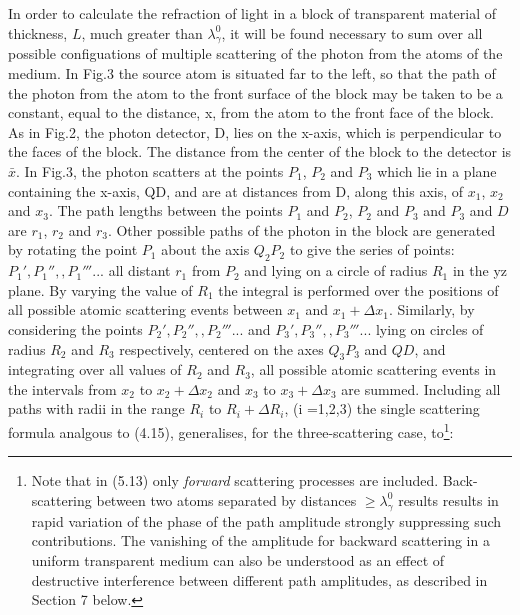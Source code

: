 \documentclass [12pt]{article}
\begin{document}
{    \par In order to calculate the
   refraction of light in a block of transparent material of thickness, $L$, much greater than $\lambda_{\gamma}^0$,
   it will be found necessary to sum over all possible configuations of multiple scattering of the
    photon from the atoms of the medium. In Fig.3 the source atom is situated far to the left,
     so that the path of the photon from the atom to the front surface of the block may be taken to
    be a constant, equal to the distance, x, from the atom to the front face of the block.
    As in Fig.2, the photon detector, D, lies on the x-axis, which is perpendicular to the
  faces of the block. The distance from the center of the block to the detector is $\bar{x}$. In 
   Fig.3, the photon scatters at the points $P_1$, $P_2$ and $P_3$ which lie in a plane
  containing the x-axis, QD, and are at distances from D, along this axis, of $x_1$, $x_2$ and $x_3$.
  The path lengths between the points $P_1$ and $P_2$,  $P_2$ and $P_3$ and  $P_3$ and $D$ are
   $r_1$, $r_2$ and $r_3$.
  Other possible paths of the photon in the block are generated by rotating the point $P_1$ 
  about the axis $Q_2 P_2$ to give the series of points: $P_1',P_1'',,P_1'''...$ all distant
  $r_1$ from $P_2$ and lying on a circle of radius $R_1$ in the yz plane. By varying the value
  of $R_1$ the integral is performed over the positions of all possible atomic scattering events 
  between $x_1$ and $x_1+\Delta x_1$. Similarly, by considering the points $P_2',P_2'',,P_2'''...$
   and $P_3',P_3'',,P_3'''...$  lying on circles of radius $R_2$ and $R_3$ respectively, 
  centered on the axes  $Q_3 P_3$ and $Q D$, and integrating over all values of 
  $R_2$ and $R_3$, all possible atomic scattering events in the intervals from  $x_2$ to $x_2+\Delta x_2$ and
   $x_3$ to $x_3+\Delta x_3$ are summed. Including all paths with radii in the range
   $R_i$ to $R_i +\Delta R_i$, (i =1,2,3) the single scattering formula analgous to (4.15),
   generalises, for the three-scattering case, to\footnote{Note that in (5.13) only {\it forward}
   scattering processes are included. Back-scattering between two atoms separated by distances 
   $\ge \lambda_{\gamma}^0$ results results in rapid variation of the phase of the path amplitude
    strongly suppressing such contributions. The vanishing of the amplitude for backward
     scattering in a uniform transparent medium can also be understood as an effect of destructive 
     interference between different path amplitudes, as described in Section 7 below.}:

}
\end{document}
